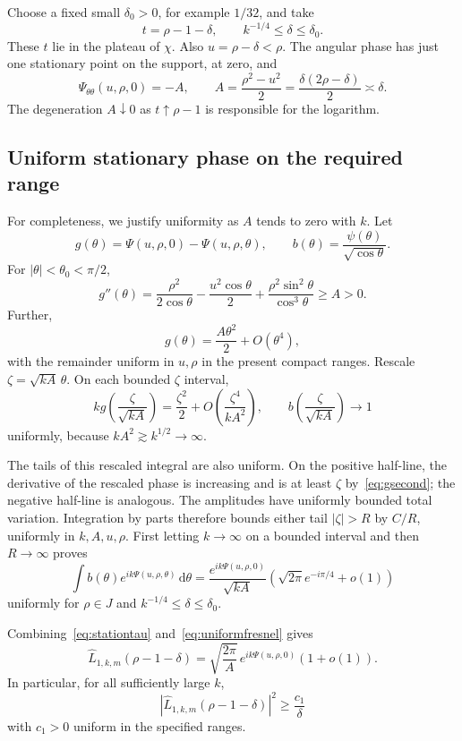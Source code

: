 \documentclass[11pt,a4paper]{article}
\theoremstyle{remark}
\newcommand{\abs}[1]{\left\lvert #1\right\rvert}
\newcommand{\dd}{\,\mathrm d}
\begin{document}
Choose a fixed small $\delta_0>0$, for example $1/32$, and take
\[
 t=\rho-1-\delta,\qquad k^{-1/4}\le\delta\le\delta_0.
\]
These $t$ lie in the plateau of $\chi$. Also $u=\rho-\delta<\rho$. The angular phase has just one stationary point on the support, at zero, and
\[
 \Psi_{\theta\theta}(u,\rho,0)=-A,
 \qquad A=\frac{\rho^2-u^2}{2}
       =\frac{\delta(2\rho-\delta)}2\asymp\delta.
\]
The degeneration $A\downarrow0$ as $t\uparrow\rho-1$ is responsible for the logarithm.

\subsection{Uniform stationary phase on the required range}

For completeness, we justify uniformity as $A$ tends to zero with $k$. Let
\[
 g(\theta)=\Psi(u,\rho,0)-\Psi(u,\rho,\theta),\qquad
 b(\theta)=\frac{\psi(\theta)}{\sqrt{\cos\theta}}.
\]
For $|\theta|<\theta_0<\pi/2$,
\begin{equation}\label{eq:gsecond}
 g''(\theta)=\frac{\rho^2}{2\cos\theta}
 -\frac{u^2\cos\theta}{2}
 +\frac{\rho^2\sin^2\theta}{\cos^3\theta}\ge A>0.
\end{equation}
Further,
\[
 g(\theta)=\frac{A\theta^2}{2}+O(\theta^4),
\]
with the remainder uniform in $u,\rho$ in the present compact ranges. Rescale $\zeta=\sqrt{kA}\,\theta$. On each bounded $\zeta$ interval,
\[
 kg\!\left(\frac\zeta{\sqrt{kA}}\right)
 =\frac{\zeta^2}{2}+O\!\left(\frac{\zeta^4}{kA^2}\right),
 \qquad b\!\left(\frac\zeta{\sqrt{kA}}\right)\to1
\]
uniformly, because $kA^2\gtrsim k^{1/2}\to\infty$.

The tails of this rescaled integral are also uniform. On the positive half-line, the derivative of the rescaled phase is increasing and is at least $\zeta$ by~\eqref{eq:gsecond}; the negative half-line is analogous. The amplitudes have uniformly bounded total variation. Integration by parts therefore bounds either tail $|\zeta|>R$ by $C/R$, uniformly in $k,A,u,\rho$. First letting $k\to\infty$ on a bounded interval and then $R\to\infty$ proves
\begin{equation}\label{eq:uniformfresnel}
 \int b(\theta)e^{ik\Psi(u,\rho,\theta)}\dd\theta
 =\frac{e^{ik\Psi(u,\rho,0)}}{\sqrt{kA}}
 \left(\sqrt{2\pi}e^{-i\pi/4}+o(1)\right)
\end{equation}
uniformly for $\rho\in J$ and $k^{-1/4}\le\delta\le\delta_0$.

Combining~\eqref{eq:stationtau} and~\eqref{eq:uniformfresnel} gives
\begin{equation}\label{eq:nystromasymp}
 \widehat L_{1,k,m}(\rho-1-\delta)
 =\sqrt{\frac{2\pi}{A}}\,e^{ik\Psi(u,\rho,0)}(1+o(1)).
\end{equation}
In particular, for all sufficiently large $k$,
\[
 \abs{\widehat L_{1,k,m}(\rho-1-\delta)}^2\ge\frac{c_1}{\delta}
\]
with $c_1>0$ uniform in the specified ranges.
\end{document}
